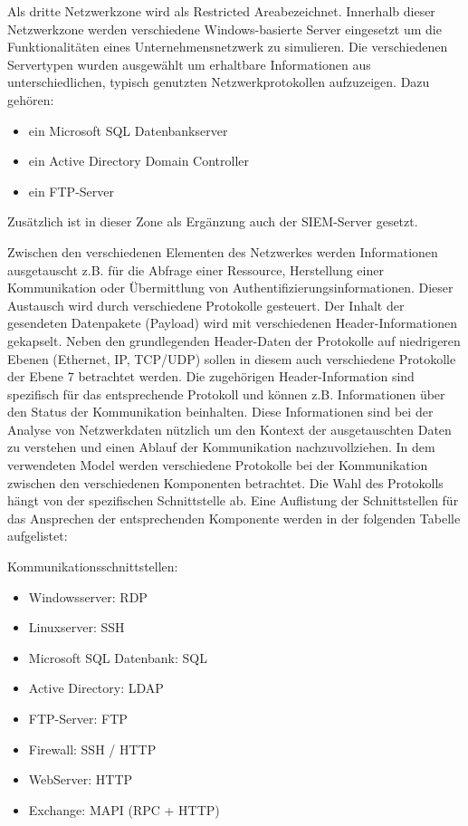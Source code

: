 Als dritte Netzwerkzone wird als \glqq Restricted Area\grqq  bezeichnet. Innerhalb dieser Netzwerkzone werden verschiedene Windows-basierte Server eingesetzt um die Funktionalitäten eines Unternehmensnetzwerk zu simulieren. Die verschiedenen Servertypen wurden ausgewählt um erhaltbare Informationen aus unterschiedlichen, typisch genutzten Netzwerkprotokollen aufzuzeigen. Dazu gehören: 
\begin{itemize}
\item ein Microsoft SQL Datenbankserver 
\item ein Active Directory Domain Controller 
\item ein FTP-Server
\end{itemize}

Zusätzlich ist in dieser Zone als Ergänzung auch der SIEM-Server gesetzt.

Zwischen den verschiedenen Elementen des Netzwerkes werden Informationen ausgetauscht z.B. für die Abfrage einer Ressource, Herstellung einer Kommunikation oder Übermittlung von Authentifizierungsinformationen. Dieser Austausch wird durch verschiedene Protokolle gesteuert. Der Inhalt der gesendeten Datenpakete (Payload) wird mit verschiedenen Header-Informationen gekapselt. Neben den grundlegenden Header-Daten der Protokolle auf niedrigeren Ebenen (Ethernet, IP, TCP/UDP) sollen in diesem auch verschiedene Protokolle der Ebene 7 betrachtet werden. Die zugehörigen Header-Information sind spezifisch für das entsprechende Protokoll und können z.B. Informationen über den Status der Kommunikation beinhalten. Diese Informationen sind bei der Analyse von Netzwerkdaten nützlich um den Kontext der ausgetauschten Daten zu verstehen und einen Ablauf der Kommunikation nachzuvollziehen.
In dem verwendeten Model werden verschiedene Protokolle bei der Kommunikation zwischen den verschiedenen Komponenten betrachtet. Die Wahl des Protokolls hängt von der spezifischen Schnittstelle ab. Eine Auflistung der Schnittstellen für das Ansprechen der entsprechenden Komponente werden in der folgenden Tabelle aufgelistet:

Kommunikationsschnittstellen:
\begin{itemize}
\item Windowsserver: RDP
\item Linuxserver: SSH
\item Microsoft SQL Datenbank: SQL
\item Active Directory: LDAP
\item FTP-Server: FTP
\item Firewall: SSH / HTTP
\item WebServer: HTTP
\item Exchange: MAPI (RPC + HTTP)
\end{itemize}

